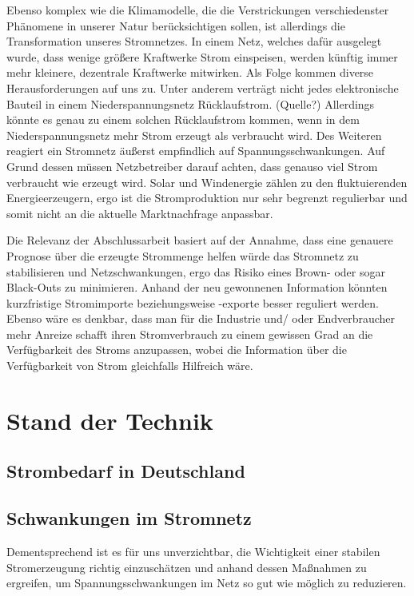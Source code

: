\documentclass[12pt, a4paper]{article}
\begin{document}
Ebenso komplex wie die Klimamodelle, die die Verstrickungen verschiedenster Phänomene in unserer Natur berücksichtigen sollen, ist allerdings die Transformation unseres Stromnetzes. In einem Netz, welches dafür ausgelegt wurde, dass wenige größere Kraftwerke Strom einspeisen, werden künftig immer mehr kleinere, dezentrale Kraftwerke mitwirken. Als Folge kommen diverse Herausforderungen auf uns zu. Unter anderem verträgt nicht jedes elektronische Bauteil in einem Niederspannungsnetz Rücklaufstrom. (Quelle?) Allerdings könnte es genau zu einem solchen Rücklaufstrom kommen, wenn in dem Niederspannungsnetz mehr Strom erzeugt als verbraucht wird. Des Weiteren reagiert ein Stromnetz äußerst empfindlich auf Spannungsschwankungen. Auf Grund dessen müssen Netzbetreiber darauf achten, dass genauso viel Strom verbraucht wie erzeugt wird. Solar und Windenergie zählen zu den fluktuierenden Energieerzeugern, ergo ist die Stromproduktion nur sehr begrenzt regulierbar und somit nicht an die aktuelle Marktnachfrage anpassbar.

Die Relevanz der Abschlussarbeit basiert auf der Annahme, dass eine genauere Prognose über die erzeugte Strommenge helfen würde das Stromnetz zu stabilisieren und Netzschwankungen, ergo das Risiko eines Brown- oder sogar Black-Outs zu minimieren. Anhand der neu gewonnenen
Information könnten kurzfristige Stromimporte beziehungsweise -exporte besser reguliert werden. Ebenso wäre es denkbar, dass man für die Industrie und/ oder Endverbraucher mehr Anreize schafft ihren Stromverbrauch zu einem gewissen Grad an die Verfügbarkeit des Stroms
anzupassen, wobei die Information über die Verfügbarkeit von Strom gleichfalls Hilfreich wäre.


\section{Stand der Technik}

\subsection{Strombedarf in Deutschland}

\subsection{Schwankungen im Stromnetz}

Dementsprechend ist es für uns unverzichtbar, die Wichtigkeit einer stabilen \linebreak Stromerzeugung richtig einzuschätzen und anhand dessen Maßnahmen zu ergreifen, um Spannungsschwankungen im Netz so gut wie möglich zu reduzieren.
\end{document}
